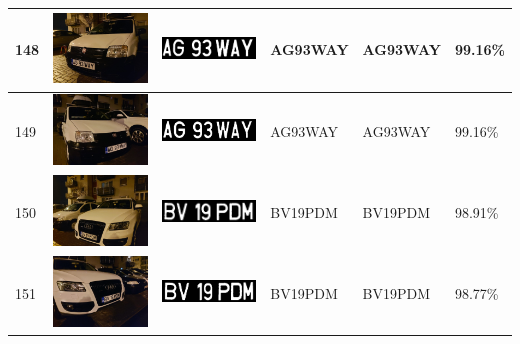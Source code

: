 \documentclass[a4paper,12pt]{report}
\begin{document}
\begin{longtable}{| m{0.6cm} | m{3cm} | m{3cm} | m{1.8cm} | m{1.8cm} | m{1.8cm} |}
    148 & \includegraphics[width=3cm,keepaspectratio]{dataset/87_d1.jpg}  & \includegraphics[width=3cm,keepaspectratio]{segmentari/148.jpg} & AG93WAY             & AG93WAY              & 99.16\%    \\ \hline
    149 & \includegraphics[width=3cm,keepaspectratio]{dataset/87_s1.jpg}  & \includegraphics[width=3cm,keepaspectratio]{segmentari/149.jpg} & AG93WAY             & AG93WAY              & 99.16\%    \\ \hline
    150 & \includegraphics[width=3cm,keepaspectratio]{dataset/88_d1.jpg}  & \includegraphics[width=3cm,keepaspectratio]{segmentari/150.jpg} & BV19PDM             & BV19PDM              & 98.91\%    \\ \hline
    151 & \includegraphics[width=3cm,keepaspectratio]{dataset/88_s1.jpg}  & \includegraphics[width=3cm,keepaspectratio]{segmentari/151.jpg} & BV19PDM             & BV19PDM              & 98.77\%    \\ \hline

\end{longtable}
\end{document}
